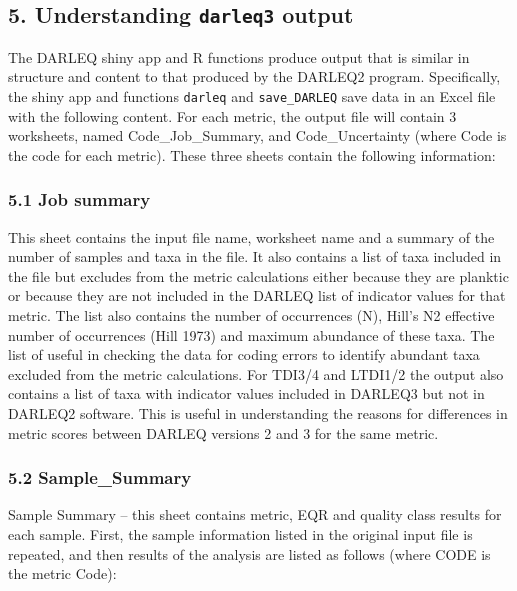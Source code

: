 \documentclass[
]{article}
\begin{document}
\hypertarget{understanding-darleq3-output}{%
\subsection{\texorpdfstring{5. Understanding \texttt{darleq3}
output}{5. Understanding darleq3 output}}\label{understanding-darleq3-output}}

The DARLEQ shiny app and R functions produce output that is similar in
structure and content to that produced by the DARLEQ2 program.
Specifically, the shiny app and functions \texttt{darleq} and
\texttt{save\_DARLEQ} save data in an Excel file with the following
content. For each metric, the output file will contain 3 worksheets,
named Code\_Job\_Summary, and Code\_Uncertainty (where Code is the code
for each metric). These three sheets contain the following information:

\hypertarget{job-summary}{%
\subsubsection{5.1 Job summary}\label{job-summary}}

This sheet contains the input file name, worksheet name and a summary of
the number of samples and taxa in the file. It also contains a list of
taxa included in the file but excludes from the metric calculations
either because they are planktic or because they are not included in the
DARLEQ list of indicator values for that metric. The list also contains
the number of occurrences (N), Hill's N2 effective number of occurrences
(Hill 1973) and maximum abundance of these taxa. The list of useful in
checking the data for coding errors to identify abundant taxa excluded
from the metric calculations. For TDI3/4 and LTDI1/2 the output also
contains a list of taxa with indicator values included in DARLEQ3 but
not in DARLEQ2 software. This is useful in understanding the reasons for
differences in metric scores between DARLEQ versions 2 and 3 for the
same metric.

\hypertarget{sample_summary}{%
\subsubsection{5.2 Sample\_Summary}\label{sample_summary}}

Sample Summary -- this sheet contains metric, EQR and quality class
results for each sample. First, the sample information listed in the
original input file is repeated, and then results of the analysis are
listed as follows (where CODE is the metric Code):
\end{document}
